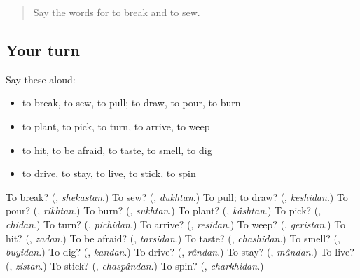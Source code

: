 \label{lesson:FA-R135-second-pass-verbs}



\begin{quote}
Say the words for to break and to sew.
\end{quote}

\subsection*{Your turn}
Say these aloud:

\begin{itemize}
\raggedright
  \item to break, to sew, to pull; to draw, to pour, to burn
  \item to plant, to pick, to turn, to arrive, to weep
  \item to hit, to be afraid, to taste, to smell, to dig
  \item to drive, to stay, to live, to stick, to spin
\end{itemize}

\begin{tcolorbox}[breakable,colback=teal!4,colframe=teal!35!black,title={Before you move on}]
To break? (\textbf{}, \emph{shekastan}.) To sew? (\textbf{}, \emph{dukhtan}.) To pull; to draw? (\textbf{}, \emph{keshidan}.) To pour? (\textbf{}, \emph{rikhtan}.) To burn? (\textbf{}, \emph{sukhtan}.) To plant? (\textbf{}, \emph{kâshtan}.) To pick? (\textbf{}, \emph{chidan}.) To turn? (\textbf{}, \emph{pichidan}.) To arrive? (\textbf{}, \emph{residan}.) To weep? (\textbf{}, \emph{geristan}.) To hit? (\textbf{}, \emph{zadan}.) To be afraid? (\textbf{}, \emph{tarsidan}.) To taste? (\textbf{}, \emph{chashidan}.) To smell? (\textbf{}, \emph{buyidan}.) To dig? (\textbf{}, \emph{kandan}.) To drive? (\textbf{}, \emph{rândan}.) To stay? (\textbf{}, \emph{mândan}.) To live? (\textbf{}, \emph{zistan}.) To stick? (\textbf{}, \emph{chaspândan}.) To spin? (\textbf{}, \emph{charkhidan}.)
\end{tcolorbox}
